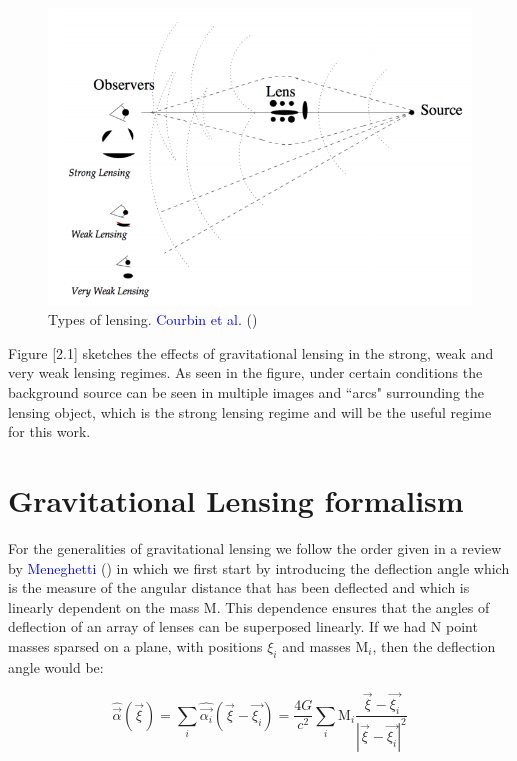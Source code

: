 \begin{figure}[H]
\centering
\includegraphics[width=12cm]{images/types_of_lensing.png}
\caption[Types of lensing]{Types of lensing. \textcolor{blue}{Courbin et al.} (\citeyear{Reference24})}
\end{figure}

Figure [2.1] sketches the effects of gravitational lensing in the strong, weak and very weak lensing regimes. As seen in the figure, under certain conditions the background source can be seen in multiple images and ``arcs" surrounding the lensing object, which is the strong lensing regime and will be the useful regime for this work. 

\section{Gravitational Lensing formalism}

For the generalities of gravitational lensing we follow the order given in a review by \textcolor{blue}{Meneghetti} (\citeyear{Reference26}) in which we first start by introducing the deflection angle which is the measure of the angular distance that has been deflected and which is linearly dependent on the mass $\text{M}$. This dependence ensures that the angles of deflection of an array of lenses can be superposed linearly. If we had N point masses sparsed on a plane, with positions $\xi_i$ and masses $\text{M}_{i}$, then the deflection angle would be:

\begin{equation}
\hat{\vec{\alpha}}(\vec{\xi})=\sum_{i}\hat{\vec{\alpha_{i}}}(\vec{\xi}-\vec{\xi_{i}})=\frac{4G}{c^{2}}\sum_{i}\textrm{M}_{i}\frac{\vec{\xi}-\vec{\xi_{i}}}{\left|\vec{\xi}-\vec{\xi_{i}}\right|^{2}}
\end{equation}

